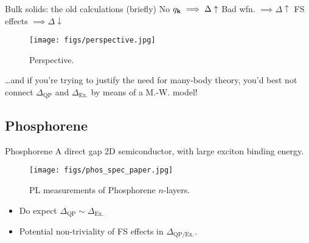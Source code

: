 \documentclass[12pt, pdf, hyperref={draft}, usenames, dvipsnames]{beamer}
\newcommand{\red}[1]{{\bf\color{LancsRed}{#1}}}
\begin{document}
\begin{frame}{Bulk solids: the old calculations (briefly)}
No $q_{\bf k} \implies \Delta \uparrow$ \hfill
Bad wfn. $\implies \Delta \uparrow$ \hfill
FS effects $\implies \Delta \downarrow$
\begin{figure}[H]
  \centering
  \texttt{[image: figs/perspective.jpg]}
  \caption{Perspective.}
\label{fig:perspective}
\end{figure}
{\tiny \ldots and if you're trying to justify the need for many-body theory,
you'd best not connect $\Delta_{\text{QP}}$ and
$\Delta_{\text{Ex.}}$ by means of a M.-W. model!}
\end{frame}

\subsection{Phosphorene}


\begin{frame}{Phosphorene}
A direct gap 2D semiconductor, with large exciton binding
energy.

\begin{figure}[H]
  \centering
  \texttt{[image: figs/phos\_spec\_paper.jpg]}
  \caption{PL measurements of Phosphorene $n$-layers.}
\label{fig:phos_spec_paper}
\end{figure}

\begin{itemize}
  \item Do \red{not} expect $\Delta_{\text{QP}} \sim \Delta_{\text{Ex.}}$
  \item Potential non-triviality of FS effects in $\Delta_{\text{QP/Ex.}}$.
\end{itemize}
\end{frame}
\end{document}
